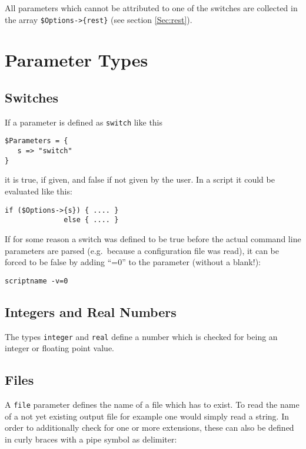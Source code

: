\documentclass[12pt, a4paper]{article}
\begin{document}
All parameters which cannot be attributed to one of the switches are collected in the array \verb'$Options->{rest}' (see section \ref{Sec:rest}).


\section{Parameter Types}

\subsection{Switches}

If a parameter is defined as \verb'switch' like this

\begin{verbatim}
$Parameters = {
   s => "switch"
}
\end{verbatim}

it is true, if given, and false if not given by the user. In a script it could be evaluated like this:

\begin{verbatim}
if ($Options->{s}) { .... }
              else { .... }
\end{verbatim}

If for some reason a switch was defined to be true before the actual command line parameters are parsed (e.g.\ because a configuration file was read), it can be forced to be false by adding ``=0'' to the parameter (without a blank!):

\begin{verbatim}
scriptname -v=0
\end{verbatim}


\subsection{Integers and Real Numbers}

The types \verb'integer' and \verb'real' define a number which is checked for being an integer or floating point value.


\subsection{Files}

A \verb'file' parameter defines the name of a file which has to exist. To read the name of a not yet existing output file for example one would simply read a string. In order to additionally check for one or more extensions, these can also be defined in curly braces with a pipe symbol as delimiter:
\end{document}
